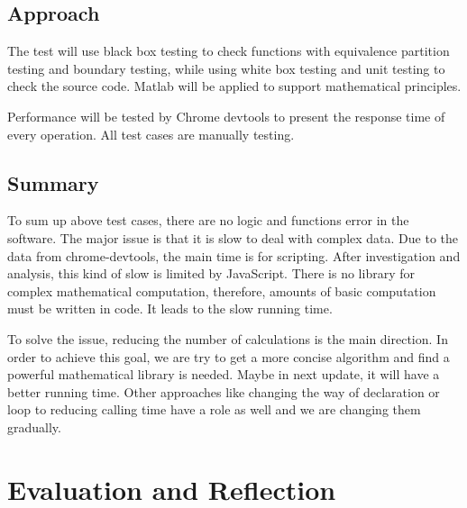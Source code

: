 \documentclass[11pt,oneside,a4paper]{article}
\begin{document}
\subsection{Approach}
The test will use black box testing to check functions with equivalence partition testing and boundary testing, while using white box testing and unit testing to check the source code. Matlab will be applied to support mathematical principles.

Performance will be tested by Chrome devtools to present the response time of every operation. All test cases are manually testing.

\subsection{Summary}
To sum up above test cases, there are no logic and functions error in the software. The major issue is that it is slow to deal with complex data. Due to the data from chrome-devtools, the main time is for scripting. After investigation and analysis, this kind of slow is limited by JavaScript. There is no library for complex mathematical computation, therefore, amounts of basic computation must be written in code. It leads to the slow running time.

To solve the issue, reducing the number of calculations is the main direction. In order to achieve this goal, we are try to get a more concise algorithm and find a powerful mathematical library is needed. Maybe in next update, it will have a better running time. Other approaches like changing the way of declaration or loop to reducing calling time have a role as well and we are changing them gradually.





\section{Evaluation and Reflection}
\end{document}
